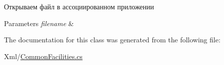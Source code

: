 Открываем файл в ассоциированном приложении 


\begin{DoxyParams}{Parameters}
{\em filename} & \\
\hline
\end{DoxyParams}


The documentation for this class was generated from the following file:\begin{DoxyCompactItemize}
\item 
Xml/\hyperlink{_common_facilities_8cs}{CommonFacilities.cs}\end{DoxyCompactItemize}
